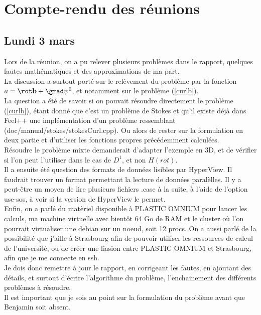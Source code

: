 \chapter{Compte-rendu des réunions}
\section{Lundi 3 mars}

Lors de la réunion, on a pu relever plusieurs problèmes dans le rapport, quelques fautes mathématiques et des approximations de ma part.\\

La discussion a surtout porté sur le relèvement du problème par la fonction $a=\rot\mathbf{b}+\grad\psi^0$, et notamment sur le problème (\ref{curlb}).\\
La question a été de savoir si on pouvait résoudre directement le problème (\ref{curlb}), étant donné que c'est un problème de Stokes et qu'il existe déjà dans Feel++ une implémentation d'un problème ressemblant (doc/manual/stokes/stokesCurl.cpp). Ou alors de rester sur la formulation en deux partie et d'utiliser les fonctions propres précédemment calculées.\\
Résoudre le problème mixte demanderait d'adapter l'exemple en 3D, et de vérifier si l'on peut l'utiliser dans le cas de $D^1$, et non $H(rot)$.\\

Il a ensuite été question des formats de données lisibles par HyperView. Il faudrait trouver un format permettant la lecture de données paralèlles. Il y a peut-être un moyen de lire plusieurs fichiers .case à la suite, à l'aide de l'option use-sos, à voir si la version de HyperView le permet.\\

Enfin, on a parlé du matèriel disponible à PLASTIC OMNIUM pour lancer les calculs, ma machine virtuelle avec bientôt 64 Go de RAM et le cluster où l'on pourrait virtualiser une debian sur un noeud, soit 12 procs. On a aussi parlé de la possibilité que j'aille à Strasbourg afin de pouvoir utiliser les ressources de calcul de l'université, ou de créer une liasion entre PLASTIC OMNIUM et Strasbourg, afin que je me connecte en ssh.\\

Je dois donc remettre à jour le rapport, en corrigeant les fautes, en ajoutant des détails, et surtout d'écrire l'algorithme du problème, l'enchainement des différents problèmes à résoudre.\\
Il est important que je sois au point sur la formulation du problème avant que Benjamin soit absent.

